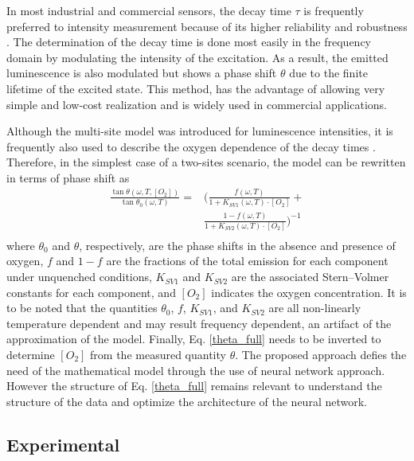 \documentclass[9pt,twocolumn,twoside,pdftex]{optica}
\begin{document}
In most industrial and commercial sensors, the decay time $\tau$ is frequently preferred to intensity measurement because of its higher reliability and robustness \cite{Wei2019}. The determination of the decay time is done most easily in the frequency domain by modulating the intensity of the excitation.  As a result, the emitted luminescence is also modulated but shows a phase shift $\theta$ due to the finite lifetime of the excited state. This method, has the advantage of allowing very simple and low-cost realization and is widely used in commercial applications.

Although the multi-site model was introduced for luminescence intensities, it is frequently also used to describe the oxygen dependence of the decay times \cite{Demas1995,Quaranta2012}. Therefore, in the simplest case of a two-sites scenario, the model can be rewritten in terms of phase shift as \cite{Michelucci2019}
\begin{equation}
\begin{aligned}
\frac{\tan \theta (\omega, T, [O_2])}{\tan \theta_0 (\omega, T)} =& \bigg( \frac{f (\omega , T) }{1+K_{SV1} (\omega , T) \cdot \left[O_2\right]}+ \\
&\frac{1-f (\omega , T) }{1+K_{SV2} (\omega , T) \cdot \left[O_2\right]} \bigg)^{-1} \\
\label{theta_full}
\end{aligned}
\end{equation}
where $\theta_0$ and $\theta$, respectively, are the phase shifts in the absence and presence of oxygen, $f$ and $1-f$ are the fractions of the total emission for each component under unquenched conditions, $K_{SV1}$ and $K_{SV2}$ are the associated Stern–Volmer constants for each component, and $\left[O_2\right]$ indicates the oxygen concentration. It is to be noted that the quantities $\theta_0$, $f$, $K_{SV1}$, and $K_{SV2}$ are all non-linearly temperature dependent \cite{Ogurtsov2006,lo2008,Zaitsev2016} and may result frequency dependent, an artifact of the approximation of the model. Finally, Eq. \ref{theta_full} needs to be inverted to determine $[O_2]$ from the measured quantity $\theta$. The proposed approach defies the need of the mathematical model through the use of neural network approach. However the structure of Eq. \ref{theta_full} remains relevant to understand the structure of the data and optimize the architecture of the neural network.


\subsection{Experimental}
\label{Experimental}
\end{document}
